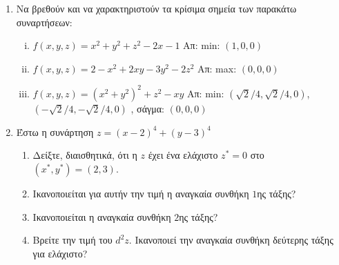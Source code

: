 \documentclass[a4paper,table]{report}
\begin{document}
\begin{enumerate}

  \item Να βρεθούν και να χαρακτηριστούν τα κρίσιμα σημεία  των παρακάτω συναρτήσεων:
    \begin{enumerate}[i)]
      \item $ f(x,y,z) = x^{2}+y^{2}+ z^{2} -2x-1 $
        \hfill Απ: min: $ (1,0,0) $  
      \item $ f(x,y,z) = 2-x^{2}+2xy-3y^{2}-2z^{2} $ 
        \hfill Απ: max: $ (0,0,0) $ 
      \item $ f(x,y,z) = (x^{2}+y^{2})^{2}+z^{2}-xy $
        \hfill Απ: min: $ (\sqrt{2} /4, \sqrt{2} /4,0) $, $ (- \sqrt{2} /4, -
        \sqrt{2} /4, 0) $ , σάγμα: $ (0,0,0) $
    \end{enumerate}

  \item Έστω η συνάρτηση $z=(x-2)^4+(y-3)^4$
    \begin{enumerate}
      \item Δείξτε, διαισθητικά, ότι η $z$ έχει ένα ελάχιστο $z^*=0$ στο 
        $(x^*,y^*)=(2,3)$.
      \item Ικανοποιείται για αυτήν την τιμή η αναγκαία συνθήκη $1$ης τάξης?
      \item Ικανοποιείται η αναγκαία συνθήκη $2$ης τάξης?
      \item Βρείτε την τιμή του $d^2z$. Ικανοποιεί την αναγκαία συνθήκη δεύτερης τάξης 
        για ελάχιστο?
    \end{enumerate}


\end{enumerate}
\end{document}

